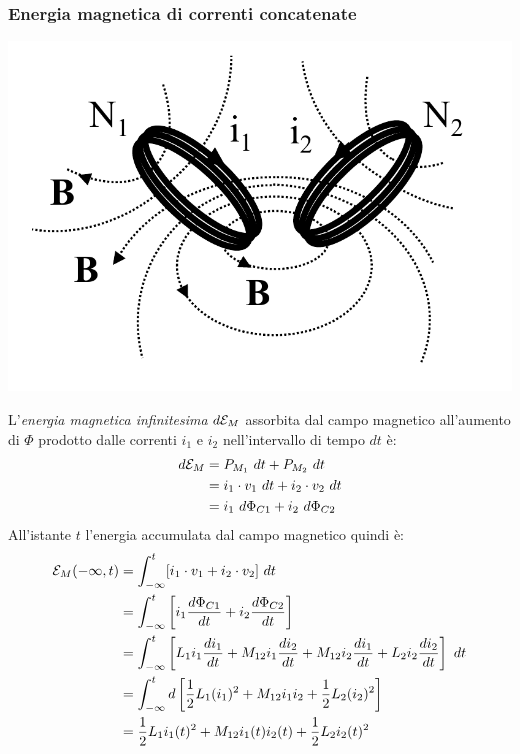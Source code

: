 \documentclass{article}
\begin{document}
\subsubsection{Energia magnetica di correnti concatenate}
\begin{center}
    \includegraphics[scale=0.27]{Image/Energia_magnetica_1.png}
\end{center}
L'\textit{energia magnetica infinitesima} $d\mathcal{E}_M$ assorbita dal campo magnetico
all'aumento di $\Phi$ prodotto dalle correnti $i_1$ e $i_2$ nell'intervallo di tempo $dt$ è:
\begin{align*}
    d\mathcal{E}_M &= P_{M_1} \ dt + P_{M_2} \ dt \\
    &= i_1 \cdot v_1 \ dt + i_2 \cdot v_2 \ dt \\
    &=i_1 \ d\Phi_{C1} + i_2 \ d\Phi_{C2}
\end{align*}
All'istante $t$ l'energia accumulata dal campo
magnetico quindi è:
\begin{align*}
    \mathcal{E}_M(- \infty, t) &= \int_{-\infty}^t [i_1 \cdot v_1 + i_2 \cdot v_2] \ dt \\
    &= \int_{-\infty}^t \left[i_1 \frac{d\Phi_{C1}}{dt} + i_2 \frac{d\Phi_{C2}}{dt}\right] \\
    &= \int_{-\infty}^t \left[L_1i_1 \frac{di_1}{dt}+M_{12}i_1 \frac{di_2}{dt}+M_{12}i_2 \frac{di_1}{dt}+L_2i_2 \frac{di_2}{dt}\right] \ dt\\
    &= \int_{-\infty}^t d \left[\frac{1}{2}L_1(i_1)^2 + M_{12}i_1i_2 + \frac{1}{2}L_2(i_2)^2\right]\\
    &= \frac{1}{2}L_1i_1(t)^2 + M_{12}i_1(t)i_2(t) + \frac{1}{2}L_2i_2(t)^2
\end{align*}
\end{document}

